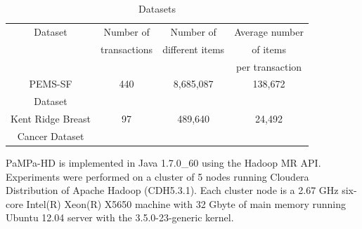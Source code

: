 \begin{table}[h!]
\begin{center}
\caption{Datasets}
\label{datasets}
\begin{tabular}{|c|c|c|c|}
\hline
	Dataset & Number of  & Number of & Average number  \\
	 & transactions &different items & of items  \\ 
	  &  & &  per transaction  \\ \hline \hline
	
PEMS-SF    & 440& 8,685,087     & 138,672 \\
       Dataset      &  &          &  \\ \hline
     Kent Ridge Breast    & 97 & 489,640    & 24,492 \\
     Cancer Dataset      &    &            &  \\ \hline
\end{tabular}
\end{center}
\end{table}


PaMPa-HD is implemented in Java 1.7.0\_60 using the Hadoop MR API.
Experiments were performed on a cluster of 5 nodes running Cloudera
Distribution of Apache Hadoop (CDH5.3.1).
Each cluster node is a 2.67 GHz six-core Intel(R) Xeon(R) X5650 machine
with 32 Gbyte of main memory
running Ubuntu 12.04 server with the 3.5.0-23-generic kernel.


